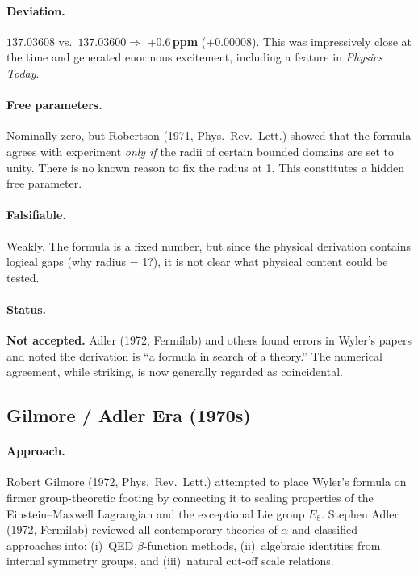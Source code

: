 \documentclass[11pt,a4paper]{article}
\begin{document}
\paragraph{Deviation.}
$137.03608$ vs.\ $137.03600 \Rightarrow$ \textbf{$+0.6$\,ppm} ($+0.00008$).
This was impressively close at the time and generated enormous excitement, including a feature in \textit{Physics Today}.

\paragraph{Free parameters.}
Nominally zero, but Robertson (1971, Phys.\ Rev.\ Lett.) showed that the formula agrees with experiment \emph{only if} the radii of certain bounded domains are set to unity.  There is no known reason to fix the radius at 1.  This constitutes a hidden free parameter.

\paragraph{Falsifiable.}
Weakly.  The formula is a fixed number, but since the physical derivation contains logical gaps (why radius = 1?), it is not clear what physical content could be tested.

\paragraph{Status.}
\textbf{Not accepted.}  Adler (1972, Fermilab) and others found errors in Wyler's papers and noted the derivation is ``a formula in search of a theory.''  The numerical agreement, while striking, is now generally regarded as coincidental.

\subsection{Gilmore / Adler Era (1970s)}\label{sec:gilmore-adler}

\paragraph{Approach.}
Robert Gilmore (1972, Phys.\ Rev.\ Lett.) attempted to place Wyler's formula on firmer group-theoretic footing by connecting it to scaling properties of the Einstein--Maxwell Lagrangian and the exceptional Lie group $E_8$.  Stephen Adler (1972, Fermilab) reviewed all contemporary theories of $\alpha$ and classified approaches into: (i)~QED $\beta$-function methods, (ii)~algebraic identities from internal symmetry groups, and (iii)~natural cut-off scale relations.
\end{document}
